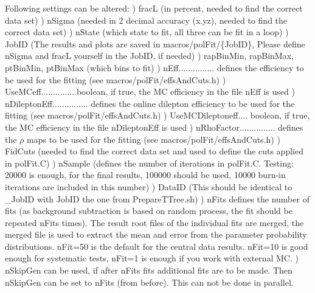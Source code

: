 \documentclass{article}
\begin{document}
Following settings can be altered:
\newline *) fracL (in percent, needed to find the correct data set)
\newline *) nSigma (needed in 2 decimal accuracy (x.yz), needed to find the correct data set)
\newline *) nState (which state to fit, all three can be fit in a loop)
\newline *) JobID (The results and plots are saved in macros/polFit/\{JobID\}, Please define nSigma and fracL yourself in the JobID, if needed)
\newline *) rapBinMin, rapBinMax, ptBinMin, ptBinMax (which bins to fit)
\newline *) nEff............... defines the efficiency to be used for the
fitting (see macros/polFit/effsAndCuts.h)
\newline *) UseMCeff...............boolean, if true, the MC efficiency in the file nEff is used
\newline *) nDileptonEff............... defines the online dilepton efficiency to be used for the
fitting (see macros/polFit/effsAndCuts.h)
\newline *) UseMCDileptoneff.... boolean, if true, the MC efficiency in the file nDileptonEff is used
\newline *) nRhoFactor............... defines the $\rho$ maps to be used for the
fitting (see macros/polFit/effsAndCuts.h)
\newline *) FidCuts (needed to find the correct data set and used to define the cuts applied in polFit.C)
\newline *) nSample (defines the number of iterations in polFit.C. Testing: 20000 is enough, for the final results, 100000 should be used, 10000 burn-in iterations are included in this number)
\newline *) DataID (This should be identical to \_JobID with JobID the one from PrepareTTree.sh)
\newline *) nFits defines the number of fits (as background subtraction is based on random process, the fit should be repeated nFits times). The result root files of the individual fits are merged, the merged file is used to extract the mean and error from the parameter probability distributions. nFit=50 is the default for the central data results. nFit=10 is good enough for systematic tests, nFit=1 is enough if you work with external MC.
\newline *) nSkipGen can be used, if after nFits fits additional fits are to be made. Then nSkipGen can be set to nFits (from before). This can not be done in parallel.
\end{document}
